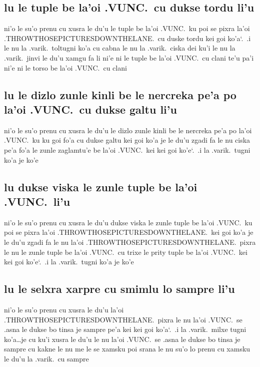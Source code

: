 \documentclass{report}
\newcommand\sds{\spacefactor\sfcode`.\ \space}
\begin{document}
\subsection{lu le tuple be la'oi .VUNC.\ cu dukse tordu li'u}
ni'o le su'o prenu cu xusra le du'u le tuple be la'oi .VUNC.\ ku poi se pixra la'oi .THROWTHOSEPICTURESDOWNTHELANE.\ cu duske tordu kei goi ko'a\sds  .i le nu la .varik.\ toltugni ko'a cu cabna le nu la .varik.\ ciska dei ku'i le nu la .varik.\ jinvi  le du'u xamgu fa li ni'e ni le tuple be la'oi .VUNC.\ cu clani te'u pa'i ni'e ni le torso be la'oi .VUNC.\ cu clani

\subsection{lu le dizlo zunle kinli be le nercreka pe'a po la'oi .VUNC.\ cu dukse galtu li'u}
ni'o le su'o prenu cu xusra le du'u le dizlo zunle kinli be le nercreka pe'a po la'oi .VUNC.\ ku ku goi fo'a cu dukse galtu kei goi ko'a je le du'u zgadi fa le nu ciska pe'a fo'a le zunle zaglamtu'e be la'oi .VUNC.\ kei kei goi ko'e\sds  .i la .varik.\ tugni ko'a je ko'e

\subsection{lu dukse viska le zunle tuple be la'oi .VUNC.\ li'u}
ni'o le su'o prenu cu xusra le du'u dukse viska le zunle tuple be la'oi .VUNC.\ ku poi se pixra la'oi .THROWTHOSEPICTURESDOWNTHELANE.\ kei goi ko'a je le du'u zgadi fa le nu la'oi .THROWTHOSEPICTURESDOWNTHELANE.\ pixra le nu le zunle tuple be la'oi .VUNC.\ cu trixe le prity tuple be la'oi .VUNC.\ kei kei goi ko'e\sds  .i la .varik.\ tugni ko'a je ko'e

\subsection{lu le selxra xarpre cu smimlu lo sampre li'u}
ni'o le su'o prenu cu xusra le du'u la'oi .THROWTHOSEPICTURESDOWNTHELANE.\ pixra le nu la'oi .VUNC.\ se .asna le dukse bo tinsa je sampre pe'a kei kei goi ko'a\sds  .i la .varik.\ milxe tugni ko'a\ldots je cu ku'i xusra le du'u le nu la'oi .VUNC.\ se .asna le dukse bo tinsa je sampre cu kakne le nu me le se xamsku poi srana le nu su'o lo prenu cu xamsku le du'u la .varik.\ cu sampre
\end{document}
